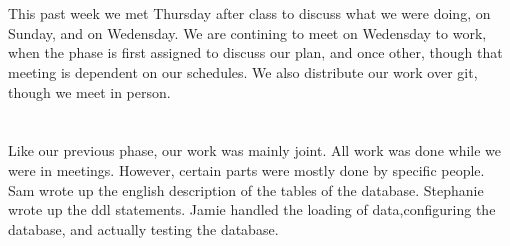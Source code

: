 \documentclass{article}
\begin{document}
\section{}


\section{}
This past week we met Thursday after class to discuss what we were doing, on
Sunday, and on Wedensday. We are contining to meet on Wedensday to work, when
the phase is first assigned to discuss our plan, and once other, though that
meeting is dependent on our schedules. We also distribute our work over git,
though we meet in person.

\section{}
Like our previous phase, our work was mainly joint. All work was done while we
were in meetings. However, certain parts were mostly done by specific people.
Sam wrote up the english description of the tables of the database. Stephanie
wrote up the ddl statements. Jamie handled the loading of data,configuring the
database, and actually testing the database.
\end{document}
